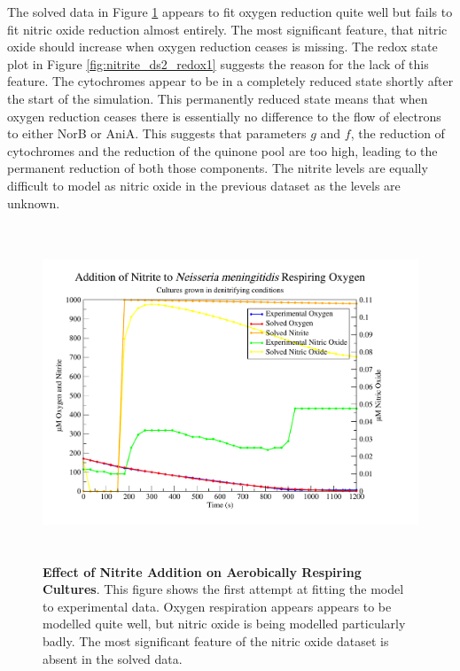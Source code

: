 The solved data in Figure \ref{fig:nitrite_ds2_solved1} appears to fit oxygen reduction quite well but fails to fit nitric oxide reduction almost entirely. The most significant feature, that nitric oxide should increase when oxygen reduction ceases is missing. The redox state plot in Figure \ref{fig:nitrite_ds2_redox1} suggests the reason for the lack of this feature. The cytochromes appear to be in a completely reduced state shortly after the start of the simulation. This permanently reduced state means that when oxygen reduction ceases there is essentially no difference to the flow of electrons to either NorB or AniA. This suggests that parameters $g$ and $f$, the reduction of cytochromes and the reduction of the quinone pool are too high, leading to the permanent reduction of both those components. The nitrite levels are equally difficult to model as nitric oxide in the previous dataset as the levels are unknown.

\begin{figure}[tbp]
 \centering
 \includegraphics[height=10cm, trim=1cm 1cm 3cm 1cm, clip=true]{./07-nitritereduction/data/dataset2-1.pdf}
 \caption[Effect of Nitrite Addition on Aerobically Respiring Cultures]{{\bf Effect of Nitrite Addition on Aerobically Respiring Cultures}. This figure shows the first attempt at fitting the model to experimental data. Oxygen respiration appears appears to be modelled quite well, but nitric oxide is being modelled particularly badly. The most significant feature of the nitric oxide dataset is absent in the solved data.
  \label{fig:nitrite_ds2_solved1}}
\end{figure}

